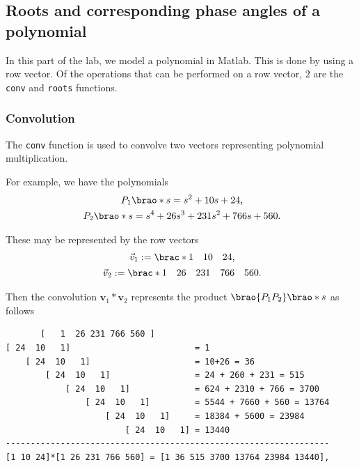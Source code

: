 \documentclass[12pt]{article}
\DeclarePairedDelimiter\brao()%
\DeclarePairedDelimiter\brac[]%
\begin{document}
\subsection{Roots and corresponding phase angles of a polynomial}

In this part of the lab, we model a polynomial in Matlab.
This is done by using a row vector.
Of the operations that can be performed on a row vector, $2$ are the \texttt{conv} and \texttt{roots} functions.

\subsubsection{Convolution}\label{sss:conv}

The \texttt{conv} function is used to convolve two vectors representing polynomial multiplication.

For example, we have the polynomials
\[
    \begin{gathered}
        P_1\brao*s = s^2 + 10s + 24\rlap, \\*
        P_2\brao*s = s^4 + 26s^3 + 231s^2 + 766s + 560\rlap. \\*
    \end{gathered}
\]

These may be represented by the row vectors
\[
    \begin{gathered}
        \vec{v}_1 := \brac*{\begin{matrix} 1 & 10 & 24 \\* \end{matrix}}\rlap, \\*
        \vec{v}_2 := \brac*{\begin{matrix} 1 & 26 & 231 & 766 & 560 \\* \end{matrix}}\rlap. \\*
    \end{gathered}
\]

\pagebreak

Then the convolution $\mathbf{v}_1 \ast \mathbf{v}_2$ represents the product $\brao{P_1 P_2}\brao*s$ as follows

\begin{verbatim}
       [   1  26 231 766 560 ]
[ 24  10   1]                         = 1
    [ 24  10   1]                     = 10+26 = 36
        [ 24  10   1]                 = 24 + 260 + 231 = 515
            [ 24  10   1]             = 624 + 2310 + 766 = 3700
                [ 24  10   1]         = 5544 + 7660 + 560 = 13764
                    [ 24  10   1]     = 18384 + 5600 = 23984
                        [ 24  10   1] = 13440
-----------------------------------------------------------------
[1 10 24]*[1 26 231 766 560] = [1 36 515 3700 13764 23984 13440],
\end{verbatim}
\end{document}
